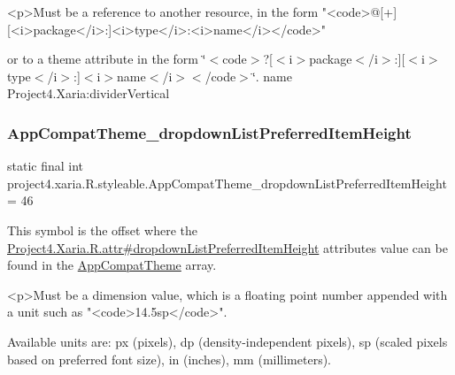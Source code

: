 \begin{DoxyVerb}      <p>Must be a reference to another resource, in the form "<code>@[+][<i>package</i>:]<i>type</i>:<i>name</i></code>"
\end{DoxyVerb}
 or to a theme attribute in the form \char`\"{}$<$code$>$?\mbox{[}$<$i$>$package$<$/i$>$\+:\mbox{]}\mbox{[}$<$i$>$type$<$/i$>$\+:\mbox{]}$<$i$>$name$<$/i$>$$<$/code$>$\char`\"{}.  name Project4.\+Xaria\+:divider\+Vertical \mbox{\label{classproject4_1_1xaria_1_1R_1_1styleable_a6564d560cb7e73a0123ed899c3b6ad2e}} 
\subsubsection{\texorpdfstring{App\+Compat\+Theme\+\_\+dropdown\+List\+Preferred\+Item\+Height}{AppCompatTheme\_dropdownListPreferredItemHeight}}
{\footnotesize\ttfamily static final int project4.\+xaria.\+R.\+styleable.\+App\+Compat\+Theme\+\_\+dropdown\+List\+Preferred\+Item\+Height = 46\hspace{0.3cm}{\ttfamily [static]}}

This symbol is the offset where the \hyperlink{}{Project4.\+Xaria.\+R.\+attr\#dropdown\+List\+Preferred\+Item\+Height} attribute\textquotesingle{}s value can be found in the \hyperlink{classproject4_1_1xaria_1_1R_1_1styleable_aad8bec413e2350f9404e6ff0e831a85d}{App\+Compat\+Theme} array.

\begin{DoxyVerb}      <p>Must be a dimension value, which is a floating point number appended with a unit such as "<code>14.5sp</code>".
\end{DoxyVerb}
 Available units are\+: px (pixels), dp (density-\/independent pixels), sp (scaled pixels based on preferred font size), in (inches), mm (millimeters). 

